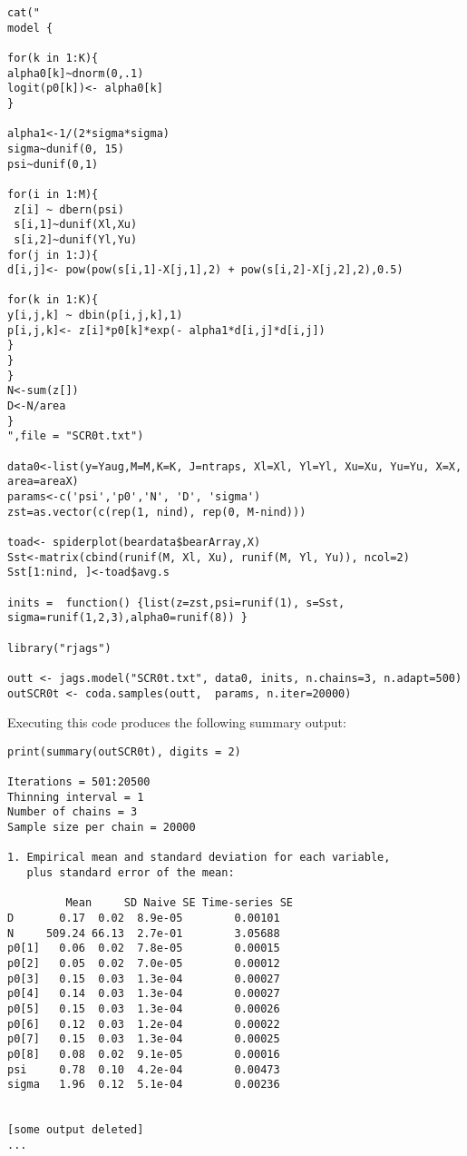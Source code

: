 {\small
\begin{verbatim}
cat("
model {

for(k in 1:K){
alpha0[k]~dnorm(0,.1)
logit(p0[k])<- alpha0[k]
}

alpha1<-1/(2*sigma*sigma)
sigma~dunif(0, 15)
psi~dunif(0,1)

for(i in 1:M){
 z[i] ~ dbern(psi)
 s[i,1]~dunif(Xl,Xu)
 s[i,2]~dunif(Yl,Yu)
for(j in 1:J){
d[i,j]<- pow(pow(s[i,1]-X[j,1],2) + pow(s[i,2]-X[j,2],2),0.5)

for(k in 1:K){
y[i,j,k] ~ dbin(p[i,j,k],1)
p[i,j,k]<- z[i]*p0[k]*exp(- alpha1*d[i,j]*d[i,j])
}
}
}
N<-sum(z[])
D<-N/area
}
",file = "SCR0t.txt")

data0<-list(y=Yaug,M=M,K=K, J=ntraps, Xl=Xl, Yl=Yl, Xu=Xu, Yu=Yu, X=X, area=areaX)
params<-c('psi','p0','N', 'D', 'sigma')
zst=as.vector(c(rep(1, nind), rep(0, M-nind)))

toad<- spiderplot(beardata$bearArray,X)
Sst<-matrix(cbind(runif(M, Xl, Xu), runif(M, Yl, Yu)), ncol=2)
Sst[1:nind, ]<-toad$avg.s

inits =  function() {list(z=zst,psi=runif(1), s=Sst, sigma=runif(1,2,3),alpha0=runif(8)) }

library("rjags")

outt <- jags.model("SCR0t.txt", data0, inits, n.chains=3, n.adapt=500)
outSCR0t <- coda.samples(outt,  params, n.iter=20000)
\end{verbatim}
}

Executing this code produces the following summary output:
{\small
\begin{verbatim}
print(summary(outSCR0t), digits = 2)

Iterations = 501:20500
Thinning interval = 1
Number of chains = 3
Sample size per chain = 20000

1. Empirical mean and standard deviation for each variable,
   plus standard error of the mean:

         Mean     SD Naive SE Time-series SE
D       0.17  0.02  8.9e-05        0.00101
N     509.24 66.13  2.7e-01        3.05688
p0[1]   0.06  0.02  7.8e-05        0.00015
p0[2]   0.05  0.02  7.0e-05        0.00012
p0[3]   0.15  0.03  1.3e-04        0.00027
p0[4]   0.14  0.03  1.3e-04        0.00027
p0[5]   0.15  0.03  1.3e-04        0.00026
p0[6]   0.12  0.03  1.2e-04        0.00022
p0[7]   0.15  0.03  1.3e-04        0.00025
p0[8]   0.08  0.02  9.1e-05        0.00016
psi     0.78  0.10  4.2e-04        0.00473
sigma   1.96  0.12  5.1e-04        0.00236


[some output deleted]
...
\end{verbatim}
}


